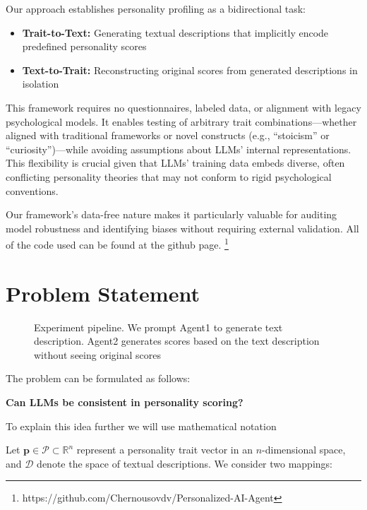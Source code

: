 \documentclass[12pt]{article}
\begin{document}
\noindent Our approach establishes personality profiling as a bidirectional task:
\begin{itemize}
    \item \textbf{Trait-to-Text:} Generating textual descriptions that implicitly encode predefined personality scores
    \item \textbf{Text-to-Trait:} Reconstructing original scores from generated descriptions in isolation
\end{itemize}

This framework requires no questionnaires, labeled data, or alignment with legacy psychological models. It enables testing of arbitrary trait combinations—whether aligned with traditional frameworks or novel constructs (e.g., ``stoicism'' or ``curiosity'')—while avoiding assumptions about LLMs' internal representations. This flexibility is crucial given that LLMs' training data embeds diverse, often conflicting personality theories that may not conform to rigid psychological conventions.



Our framework's data-free nature makes it particularly valuable for auditing model robustness and identifying biases without requiring external validation. All of the code used can be found at the github page. \footnote{https://github.com/Chernousovdv/Personalized-AI-Agent}


\section{Problem Statement}

\begin{figure}[htbp]
  \centering
  \caption{Experiment pipeline. We prompt Agent1 to generate text description. Agent2 generates scores based on the text description without seeing original scores}
  \label{fig:personality}
\end{figure}

The problem can be formulated as follows:

\begin{center}
    \textbf{Can LLMs be consistent in personality scoring?}
\end{center}

To explain this idea further we will use mathematical notation

Let $\mathbf{p} \in \mathcal{P} \subset \mathbb{R}^n$ represent a personality trait vector in an $n$-dimensional space, and $\mathcal{D}$ denote the space of textual descriptions. We consider two mappings:
\end{document}
